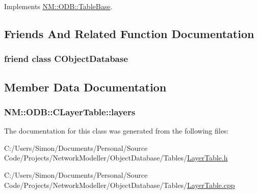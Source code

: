Implements \hyperlink{class_n_m_1_1_o_d_b_1_1_table_base_a3e55bfe64ccdf81e6a96941b3f9a5fb4}{N\+M\+::\+O\+D\+B\+::\+Table\+Base}.



\subsection{Friends And Related Function Documentation}
\hypertarget{class_n_m_1_1_o_d_b_1_1_c_layer_table_a8451ee9e81bc51a04afb10dc6ee7e07e}{}
\subsubsection[{C\+Object\+Database}]{\setlength{\rightskip}{0pt plus 5cm}friend class {\bf C\+Object\+Database}\hspace{0.3cm}{\ttfamily [friend]}}\label{class_n_m_1_1_o_d_b_1_1_c_layer_table_a8451ee9e81bc51a04afb10dc6ee7e07e}


\subsection{Member Data Documentation}
\hypertarget{class_n_m_1_1_o_d_b_1_1_c_layer_table_a24f25cc4cd1e097b5c66f25369654fed}{}
\subsubsection[{layers}]{ N\+M\+::\+O\+D\+B\+::\+C\+Layer\+Table\+::layers}\label{class_n_m_1_1_o_d_b_1_1_c_layer_table_a24f25cc4cd1e097b5c66f25369654fed}


The documentation for this class was generated from the following files\+:\begin{DoxyCompactItemize}
\item 
C\+:/\+Users/\+Simon/\+Documents/\+Personal/\+Source Code/\+Projects/\+Network\+Modeller/\+Object\+Database/\+Tables/\hyperlink{_layer_table_8h}{Layer\+Table.\+h}\item 
C\+:/\+Users/\+Simon/\+Documents/\+Personal/\+Source Code/\+Projects/\+Network\+Modeller/\+Object\+Database/\+Tables/\hyperlink{_layer_table_8cpp}{Layer\+Table.\+cpp}\end{DoxyCompactItemize}
